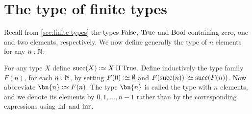 \section{The type of finite types}
\label{sec:typeFin}
Recall from \cref{sec:finite-types} the types
$\mathrm{False}$, $\mathrm{True}$ and $\mathrm{Bool}$ containing zero, one and two
elements, respectively. We now define generally the
type of $n$ elements for any $n:\mathbb{N}$.

\begin{definition}\label{def:finiteset}
For any type $X$ define $\Succ(X)\defeq X\amalg\true$.
Define inductively the type family $F(n)$, for each $n:\mathbb{N}$, by
setting $F(0)\defeq\emptytype$ and $F(\Succ(n))\defeq\Succ(F(n))$.
Now abbreviate $\bn{n}\defeq F(n)$. The type $\bn{n}$ is called
the type with $n$ elements, and we denote its elements
by $0,1,\ldots,n-1$ rather than by the corresponding expressions
using $\inl{}$ and $\inr{}$.
\end{definition}

